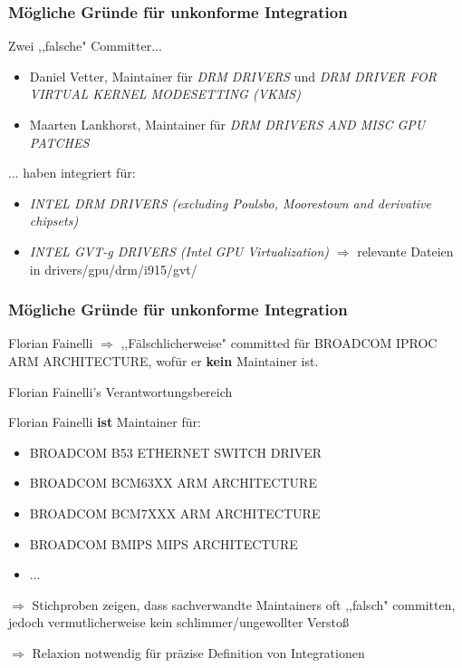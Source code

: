 \documentclass{beamer}
\begin{document}
	\begin{frame}
	\frametitle{Mögliche Gründe für unkonforme Integration}
	\begin{block}{Zwei ,,falsche" Committer...}
		\begin{itemize}
			\item Daniel Vetter, Maintainer für \textit{DRM DRIVERS} und \textit{DRM DRIVER FOR VIRTUAL KERNEL MODESETTING (VKMS)}
			\item Maarten Lankhorst, Maintainer für \textit{DRM DRIVERS AND MISC GPU PATCHES}
		\end{itemize}
	\end{block}
	\begin{block}{... haben integriert für:}
		\begin{itemize}
			\item \textit{INTEL DRM DRIVERS (excluding Poulsbo, Moorestown and derivative chipsets)}
			\item \textit{INTEL GVT-g DRIVERS (Intel GPU Virtualization)} $\Rightarrow$ relevante Dateien in drivers/gpu/drm/i915/gvt/
		\end{itemize}
	\end{block}
	\end{frame}

	\begin{frame}
	\frametitle{Mögliche Gründe für unkonforme Integration}
	Florian Fainelli $\Rightarrow$ ,,Fälschlicherweise" committed für BROADCOM IPROC ARM ARCHITECTURE, wofür er \textbf{kein} Maintainer ist.
	\begin{block}{Florian Fainelli's Verantwortungsbereich}

		Florian Fainelli \textbf{ist} Maintainer für:
		\begin{itemize}
			\item BROADCOM B53 ETHERNET SWITCH DRIVER
			\item BROADCOM BCM63XX ARM ARCHITECTURE
			\item BROADCOM BCM7XXX ARM ARCHITECTURE
			\item BROADCOM BMIPS MIPS ARCHITECTURE
			\item ...
		\end{itemize}
	\end{block}

	$\Rightarrow$ Stichproben zeigen, dass sachverwandte Maintainers oft ,,falsch" committen, jedoch vermutlicherweise kein schlimmer/ungewollter Verstoß

	$\Rightarrow$ Relaxion notwendig für präzise Definition von Integrationen
	\end{frame}
\end{document}
